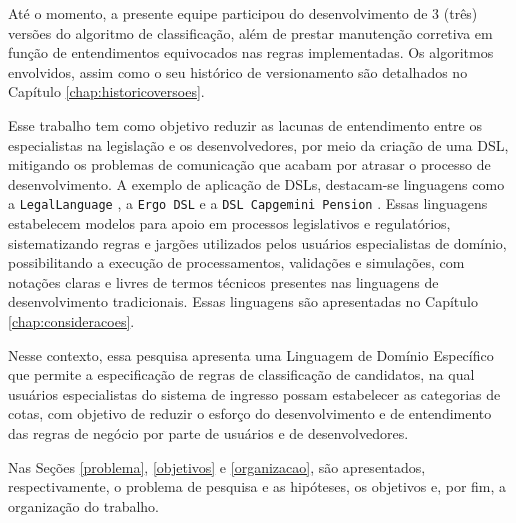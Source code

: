 Até o momento, a presente equipe participou do desenvolvimento de 3 (três) versões do algoritmo de classificação, além de prestar manutenção corretiva em função de entendimentos equivocados nas regras implementadas.  Os algoritmos envolvidos, assim como o seu histórico de versionamento são detalhados no Capítulo \ref{chap:historicoversoes}.

Esse trabalho tem como objetivo reduzir as lacunas de entendimento entre os especialistas na legislação e os desenvolvedores, por meio da criação de uma \gls{DSL}, mitigando os problemas de comunicação que acabam por atrasar o processo de desenvolvimento. A exemplo de aplicação de DSLs, destacam-se linguagens como a \texttt{LegalLanguage} \cite{legallanguage}, a \texttt{Ergo DSL} \cite{accordproject} e a \texttt{DSL Capgemini Pension} \cite{kolkhenk2008}. Essas linguagens estabelecem modelos para apoio em processos legislativos e regulatórios, sistematizando regras e jargões utilizados pelos usuários especialistas de domínio, possibilitando a execução de processamentos, validações e simulações, com notações claras e livres de termos técnicos presentes nas linguagens de desenvolvimento tradicionais. Essas linguagens são apresentadas no Capítulo \ref{chap:consideracoes}.

Nesse contexto, essa pesquisa apresenta uma Linguagem de Domínio Específico que permite a especificação de regras de classificação de candidatos, na qual usuários especialistas do sistema de ingresso possam estabelecer as categorias de cotas, com objetivo de reduzir o esforço do desenvolvimento e de entendimento das regras de negócio por parte de usuários e de desenvolvedores. 

Nas Seções \ref{problema}, \ref{objetivos} e \ref{organizacao}, são apresentados, respectivamente, o problema de pesquisa e as hipóteses, os objetivos e, por fim, a organização do trabalho.

